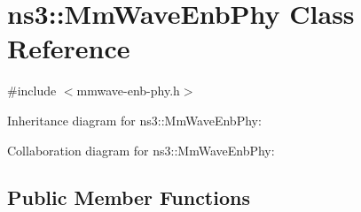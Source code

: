 \hypertarget{classns3_1_1MmWaveEnbPhy}{}\section{ns3\+:\+:Mm\+Wave\+Enb\+Phy Class Reference}
\label{classns3_1_1MmWaveEnbPhy}


{\ttfamily \#include $<$mmwave-\/enb-\/phy.\+h$>$}



Inheritance diagram for ns3\+:\+:Mm\+Wave\+Enb\+Phy\+:


Collaboration diagram for ns3\+:\+:Mm\+Wave\+Enb\+Phy\+:
\subsection*{Public Member Functions}

